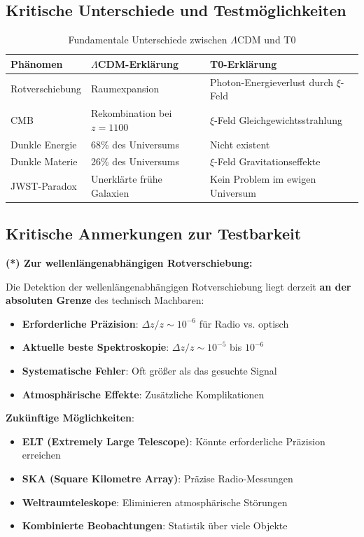 \subsection{Kritische Unterschiede und Testmöglichkeiten}
\label{subsec:critical_differences}

\begin{table}[h]
	\centering
	\begin{tabular}{p{4cm}p{5cm}p{5cm}}
		\toprule
		\textbf{Phänomen} & \textbf{$\Lambda$CDM-Erklärung} & \textbf{T0-Erklärung} \\
		\midrule
		Rotverschiebung & Raumexpansion & Photon-Energieverlust durch $\xi$-Feld \\
		CMB & Rekombination bei $z=1100$ & $\xi$-Feld Gleichgewichtsstrahlung \\
		Dunkle Energie & 68\% des Universums & Nicht existent \\
		Dunkle Materie & 26\% des Universums & $\xi$-Feld Gravitationseffekte \\
		JWST-Paradox & Unerklärte frühe Galaxien & Kein Problem im ewigen Universum \\
		\bottomrule
	\end{tabular}
	\caption{Fundamentale Unterschiede zwischen $\Lambda$CDM und T0}
\end{table}

\subsection{Kritische Anmerkungen zur Testbarkeit}
\label{subsec:testability_notes}

\textbf{(*) Zur wellenlängenabhängigen Rotverschiebung:}

Die Detektion der wellenlängenabhängigen Rotverschiebung liegt derzeit \textbf{an der absoluten Grenze} des technisch Machbaren:

\begin{itemize}
	\item \textbf{Erforderliche Präzision}: $\Delta z/z \sim 10^{-6}$ für Radio vs. optisch
	\item \textbf{Aktuelle beste Spektroskopie}: $\Delta z/z \sim 10^{-5}$ bis $10^{-6}$
	\item \textbf{Systematische Fehler}: Oft größer als das gesuchte Signal
	\item \textbf{Atmosphärische Effekte}: Zusätzliche Komplikationen
\end{itemize}

\textbf{Zukünftige Möglichkeiten}:
\begin{itemize}
	\item \textbf{ELT (Extremely Large Telescope)}: Könnte erforderliche Präzision erreichen
	\item \textbf{SKA (Square Kilometre Array)}: Präzise Radio-Messungen
	\item \textbf{Weltraumteleskope}: Eliminieren atmosphärische Störungen
	\item \textbf{Kombinierte Beobachtungen}: Statistik über viele Objekte
\end{itemize}


